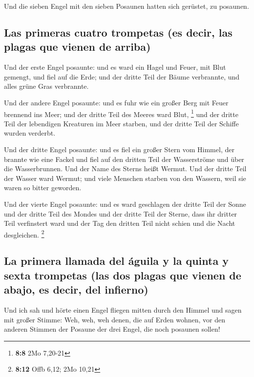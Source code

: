 Und die sieben Engel mit den sieben Posaunen hatten sich
gerüstet, zu posaunen.

\hypertarget{las-primeras-cuatro-trompetas-es-decir-las-plagas-que-vienen-de-arriba}{%
\subsection{Las primeras cuatro trompetas (es decir, las plagas que
vienen de
arriba)}\label{las-primeras-cuatro-trompetas-es-decir-las-plagas-que-vienen-de-arriba}}

 Und der erste Engel posaunte: und es ward ein Hagel und
Feuer, mit Blut gemengt, und fiel auf die Erde; und der dritte Teil der
Bäume verbrannte, und alles grüne Gras verbrannte.

 Und der andere Engel posaunte: und es fuhr wie ein großer
Berg mit Feuer brennend ins Meer; und der dritte Teil des Meeres ward
Blut, \footnote{\textbf{8:8} 2Mo 7,20-21}  und der dritte
Teil der lebendigen Kreaturen im Meer starben, und der dritte Teil der
Schiffe wurden verderbt.

 Und der dritte Engel posaunte: und es fiel ein großer
Stern vom Himmel, der brannte wie eine Fackel und fiel auf den dritten
Teil der Wasserströme und über die Wasserbrunnen.  Und
der Name des Sterns heißt Wermut. Und der dritte Teil der Wasser ward
Wermut; und viele Menschen starben von den Wassern, weil sie waren so
bitter geworden.

 Und der vierte Engel posaunte: und es ward geschlagen
der dritte Teil der Sonne und der dritte Teil des Mondes und der dritte
Teil der Sterne, dass ihr dritter Teil verfinstert ward und der Tag den
dritten Teil nicht schien und die Nacht desgleichen. \footnote{\textbf{8:12}
  Offb 6,12; 2Mo 10,21}

\hypertarget{la-primera-llamada-del-uxe1guila-y-la-quinta-y-sexta-trompetas-las-dos-plagas-que-vienen-de-abajo-es-decir-del-infierno}{%
\subsection{La primera llamada del águila y la quinta y sexta trompetas
(las dos plagas que vienen de abajo, es decir, del
infierno)}\label{la-primera-llamada-del-uxe1guila-y-la-quinta-y-sexta-trompetas-las-dos-plagas-que-vienen-de-abajo-es-decir-del-infierno}}

 Und ich sah und hörte einen Engel fliegen mitten durch
den Himmel und sagen mit großer Stimme: Weh, weh, weh denen, die auf
Erden wohnen, vor den anderen Stimmen der Posaune der drei Engel, die
noch posaunen sollen!

